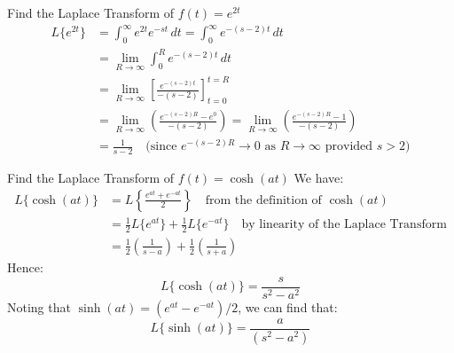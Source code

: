 \documentclass[a4paper, 10pt]{article}
\begin{document}
\begin{examplebox}{Find the Laplace Transform of $f(t) = e^{2t}$}{}
  \begin{align*}
    L\{e^{2t}\}
     & = \int_0^\infty e^{2t}e^{-st}\, dt
    = \int_0^\infty e^{-(s-2)t}\, dt                                                                               \\[1mm]
     & = \lim_{R\to\infty} \int_0^R e^{-(s-2)t}\, dt                                                               \\[1mm]
     & = \lim_{R\to\infty} \left[ \frac{e^{-(s-2)t}}{-(s-2)} \right]_{t=0}^{t=R}                                   \\[1mm]
     & = \lim_{R\to\infty} \left( \frac{e^{-(s-2)R} - e^0}{-(s-2)} \right)
    = \lim_{R\to\infty} \left( \frac{e^{-(s-2)R} - 1}{-(s-2)} \right)                                              \\[1mm]
     & = \frac{1}{s-2} \quad \text{(since } e^{-(s-2)R} \to 0 \text{ as } R\to\infty \text{ provided } s>2\text{)}
  \end{align*}
\end{examplebox}

\begin{examplebox}{Find the Laplace Transform of $f(t) = \cosh(at)$}{}
  We have:
  \begin{align*}
    L\{\cosh(at)\} & = L\left\{ \frac{e^{at} + e^{-at}}{2}\right\} \quad \text{from the definition of }\cosh(at)           \\
                   & = \frac{1}{2}L\{e^{at}\} + \frac{1}{2}L\{e^{-at}\} \quad \text{by linearity of the Laplace Transform} \\
                   & = \frac{1}{2}\left(\frac{1}{s-a}\right) + \frac{1}{2}\left(\frac{1}{s+a}\right)
  \end{align*}
  Hence:
  $$L\{\cosh(at)\} = \frac{s}{s^2 - a^2}$$
  Noting that $\sinh(at) = (e^{at} - e^{-at})/2$, we can find that:
  $$L\{\sinh(at)\} = \frac{a}{(s^2 - a^2)}$$
\end{examplebox}
\end{document}
